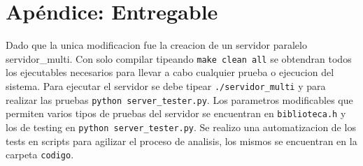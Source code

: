 \section{Ap\'endice: Entregable}
Dado que la unica modificacion fue la creacion de un servidor paralelo servidor\_multi. Con solo compilar tipeando \verb|make clean all| se obtendran todos los ejecutables necesarios para llevar a cabo cualquier prueba o ejecucion del sistema. Para ejecutar el servidor se debe tipear \verb|./servidor_multi| y para realizar las pruebas \verb|python server_tester.py|. Los parametros modificables que permiten varios tipos de pruebas del servidor se encuentran en \verb|biblioteca.h| y los de testing en \verb|python server_tester.py|. Se realizo una automatizacion de los tests en scripts para agilizar el proceso de analisis, los mismos se encuentran en la carpeta \verb|codigo|.